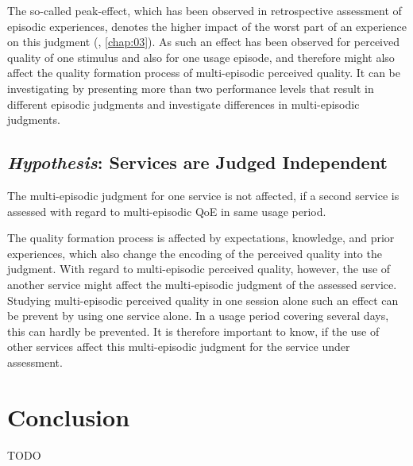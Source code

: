 The so-called peak-effect, which has been observed in retrospective assessment of episodic experiences, denotes the higher impact of the worst part of an experience on this judgment (\cf, \autoref{chap:03}).
As such an effect has been observed for perceived quality of one stimulus and also for one usage episode, and therefore might also affect the quality formation process of multi-episodic perceived quality.
It can be investigating by presenting more than two performance levels that result in different episodic judgments and investigate differences in multi-episodic judgments.

\subsection{\emph{Hypothesis}: Services are Judged Independent}
\begin{hypothesis}\label{hypo:independent}
The multi-episodic judgment for one service is not affected, if a second service is assessed with regard to multi-episodic QoE in same usage period.
\end{hypothesis}

The quality formation process is affected by expectations, knowledge, and prior experiences, which also change the encoding of the perceived quality into the judgment.
With regard to multi-episodic perceived quality, however, the use of another service might affect the multi-episodic judgment of the assessed service.
Studying multi-episodic perceived quality in one session alone such an effect can be prevent by using one service alone.
In a usage period covering several days, this can hardly be prevented.
It is therefore important to know, if the use of other services affect this multi-episodic judgment for the service under assessment.

\section{Conclusion}
TODO








